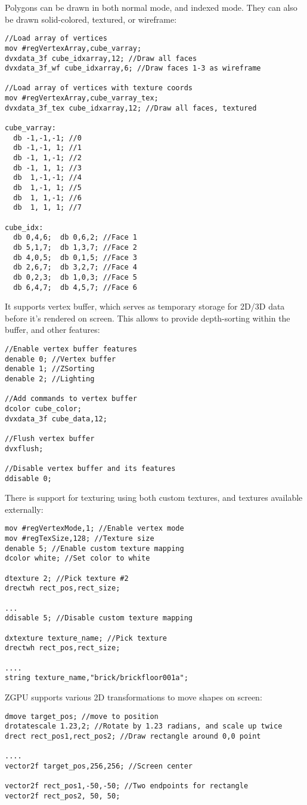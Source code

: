 Polygons can be drawn in both normal mode, and indexed mode. They can also be drawn solid-colored, textured, or wireframe:
\begin{verbatim}
//Load array of vertices
mov #regVertexArray,cube_varray; 
dvxdata_3f cube_idxarray,12; //Draw all faces
dvxdata_3f_wf cube_idxarray,6; //Draw faces 1-3 as wireframe

//Load array of vertices with texture coords
mov #regVertexArray,cube_varray_tex; 
dvxdata_3f_tex cube_idxarray,12; //Draw all faces, textured

cube_varray:
  db -1,-1,-1; //0
  db -1,-1, 1; //1
  db -1, 1,-1; //2
  db -1, 1, 1; //3
  db  1,-1,-1; //4
  db  1,-1, 1; //5
  db  1, 1,-1; //6
  db  1, 1, 1; //7
  
cube_idx:
  db 0,4,6;  db 0,6,2; //Face 1
  db 5,1,7;  db 1,3,7; //Face 2
  db 4,0,5;  db 0,1,5; //Face 3
  db 2,6,7;  db 3,2,7; //Face 4
  db 0,2,3;  db 1,0,3; //Face 5
  db 6,4,7;  db 4,5,7; //Face 6
\end{verbatim}

It supports vertex buffer, which serves as temporary storage for 2D/3D data before it's rendered on screen. This allows to provide depth-sorting within the buffer, and other features:
\begin{verbatim}
//Enable vertex buffer features
denable 0; //Vertex buffer
denable 1; //ZSorting
denable 2; //Lighting

//Add commands to vertex buffer
dcolor cube_color;
dvxdata_3f cube_data,12;

//Flush vertex buffer
dvxflush;

//Disable vertex buffer and its features
ddisable 0;
\end{verbatim}

There is support for texturing using both custom textures, and textures available externally:
\begin{verbatim}
mov #regVertexMode,1; //Enable vertex mode
mov #regTexSize,128; //Texture size
denable 5; //Enable custom texture mapping
dcolor white; //Set color to white

dtexture 2; //Pick texture #2
drectwh rect_pos,rect_size;

...
ddisable 5; //Disable custom texture mapping

dxtexture texture_name; //Pick texture
drectwh rect_pos,rect_size;

....
string texture_name,"brick/brickfloor001a";
\end{verbatim}

ZGPU supports various 2D transformations to move shapes on screen:
\begin{verbatim}
dmove target_pos; //move to position
drotatescale 1.23,2; //Rotate by 1.23 radians, and scale up twice
drect rect_pos1,rect_pos2; //Draw rectangle around 0,0 point

....
vector2f target_pos,256,256; //Screen center

vector2f rect_pos1,-50,-50; //Two endpoints for rectangle
vector2f rect_pos2, 50, 50;
\end{verbatim}

